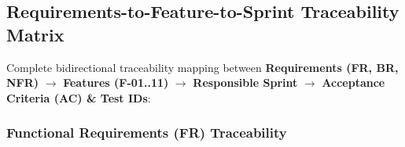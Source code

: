 \documentclass[11pt,a4paper]{article}
\begin{document}
\subsection{Requirements-to-Feature-to-Sprint Traceability Matrix}

Complete bidirectional traceability mapping between \textbf{Requirements (FR, BR, NFR)} $\rightarrow$ \textbf{Features (F-01..11)} $\rightarrow$ \textbf{Responsible Sprint} $\rightarrow$ \textbf{Acceptance Criteria (AC) \& Test IDs}:\\

\subsubsection{Functional Requirements (FR) Traceability}

\small
\vspace{0.3em}
\end{document}
